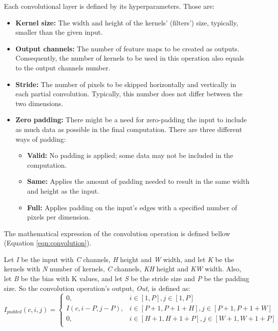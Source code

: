 Each convolutional layer is defined by its hyperparameters. Those are:
\begin{itemize}
	\item \textbf{Kernel size:} The width and height of the kernels' (filters') size, typically, small\-er than the given input.
	\item \textbf{Output channels:} The number of feature maps to be created as outputs. Consequently, the number of kernels to be used in this operation also equals to the output channels number.
	\item \textbf{Stride:} The number of pixels to be skipped horizontally and vertically in each partial convolution. Typically, this number does not differ between the two dimensions.
	\item \textbf{Zero padding:} There might be a need for zero-padding the input to include as much data as possible in the final computation. There are three different ways of padding:
	      \begin{itemize}
		      \item \textbf{Valid:} No padding is applied; some data may not be included in the computation.
		      \item \textbf{Same:} Applies the amount of padding needed to result in the same width and height as the input.
		      \item \textbf{Full:} Applies padding on the input's edges with a specified number of pixels per dimension.
	      \end{itemize}
\end{itemize}

The mathematical expression of the convolution operation is defined bellow (Equation \ref{eqn:convolution}).

Let \emph{I} be the input with \emph{C} channels, \emph{H} height and \emph{W} width, and let \emph{K} be the kernels with \emph{N} number of kernels, \emph{C} channels, \emph{KH} height and \emph{KW} width. Also, let \emph{B} be the bias with K values, and let \emph{S} be the stride size and \emph{P} be the padding size. So the convolution operation's output, \emph{Out}, is defined as:
\begin{equation}
	I_{padded}(c, i, j) = \begin{cases}
		0,                  & i \in [1, P], j \in [1, P]                         \\
		I(c, i - P, j - P), & i \in [P + 1, P + 1 + H], j \in [P + 1, P + 1 + W] \\
		0,                  & i \in [H + 1, H + 1 + P], j \in [W + 1, W + 1 + P] \\
	\end{cases}
\end{equation}

